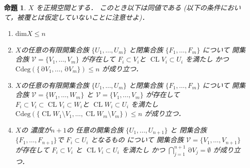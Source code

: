 \documentclass[leqno, a4paper, 12pt]{jsarticle}
\newtheorem{prop}[thm]{命題}
\DeclareMathOperator{\bd}{\partial}
\DeclareMathOperator{\cl}{CL}
\newcommand{\yodim}{\mathrm{dim}}
\newcommand{\yodeg}{\mathrm{Cdeg}}
\numberwithin{equation}{section}
\begin{document}
\begin{prop}\label{prop:hihukudim3}
$X$
を正規空間とする．
このとき以下は同値である
(以下の条件において，被覆とは仮定していないことに注意せよ)．
\begin{enumerate}[label=\textup{(\arabic*)}]
\item\label{item:prop:dimn} 
$\yodim X\le n$


\item\label{item:prop:bdm} 

$X$の任意の有限開集合族
$\{U_{1}, \dots, U_{m}\}$
と閉集合族
$\{F_{1}, \dots, F_{m}\}$
について
開集合族
$\mathcal{V}=\{V_{1}, \dots, V_{m}\}$
が存在して
$F_{i}\subset V_{i}$と
$\cl V_{i}\subset U_{i}$
を満たし
かつ
$\yodeg(\{\bd V_{1}, \dots, \bd V_{m}\})\le n$
が成り立つ．


\item\label{item:prop:fatbdm} 
$X$の任意の有限開集合族
$\{U_{1}, \dots, U_{m}\}$
と閉集合族
$\{F_{1}, \dots, F_{m}\}$
について
開集合族
$\mathcal{V}=\{W_{1}, \dots, W_{m}\}$
と
$\mathcal{V}=\{V_{1}, \dots, V_{m}\}$
が存在して
$F_{i}\subset V_{i} \subset \cl V_{i}\subset W_{i}$と
$\cl W_{i}\subset U_{i}$
を満たし
$\yodeg(\{\cl W_{1}\setminus V_{1}, \dots, \cl W_{m}\setminus  V_{m}\})\le n$
が成り立つ．

\item\label{item:prop:bdn+1} 
$X$の
濃度が$n+1$の
任意の開集合族
$\{U_{1}, \dots, U_{n+1}\}$
と
閉集合族
$\{F_{1}, \dots, F_{n+1}\}$で
$F_{i}\subset U_{i}$
となるもの
について
開集合族
$\mathcal{V}=\{V_{1}, \dots, V_{n+1}\}$
が存在して
$F_{i}\subset V_{i}$
と
$\cl V_{i}\subset U_{i}$
を満たし
かつ
$\bigcap_{j=1}^{n+1}\bd V_{j}=\emptyset$
が成り立つ．





\end{enumerate}
\end{prop}
\end{document}
